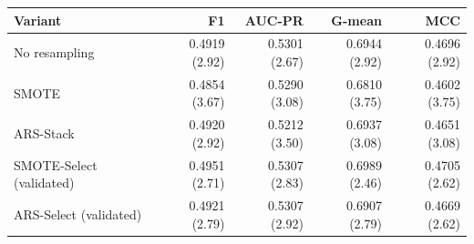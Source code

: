 \begin{tabular}{lrrrr}
\toprule
Variant & F1 & AUC-PR & G-mean & MCC \\
\midrule
No resampling & 0.4919 (2.92) & 0.5301 (2.67) & 0.6944 (2.92) & 0.4696 (2.92) \\
SMOTE & 0.4854 (3.67) & 0.5290 (3.08) & 0.6810 (3.75) & 0.4602 (3.75) \\
ARS-Stack & 0.4920 (2.92) & 0.5212 (3.50) & 0.6937 (3.08) & 0.4651 (3.08) \\
SMOTE-Select (validated) & 0.4951 (2.71) & 0.5307 (2.83) & 0.6989 (2.46) & 0.4705 (2.62) \\
ARS-Select (validated) & 0.4921 (2.79) & 0.5307 (2.92) & 0.6907 (2.79) & 0.4669 (2.62) \\
\bottomrule
\end{tabular}
